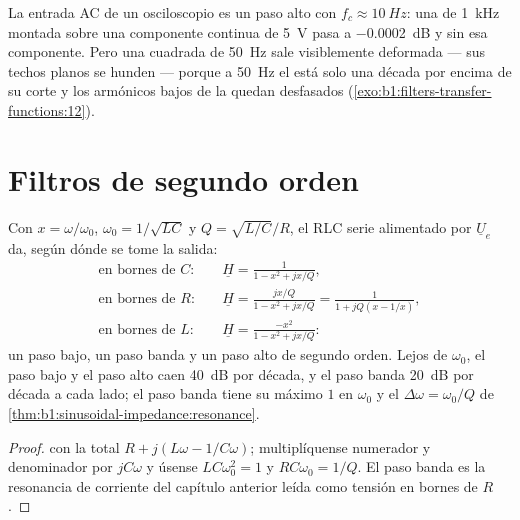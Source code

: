 \begin{example}\label{ex:b1:filters-transfer-functions:accoupling}
La entrada AC de un osciloscopio es un paso alto con
$f_c \approx \qty{10}{Hz}$: una  de \qty{1}{kHz} montada sobre una
componente continua de \qty{5}{V} pasa a \qty{-0.0002}{dB} y sin esa
componente. Pero una  cuadrada de \qty{50}{Hz} sale visiblemente
deformada --- sus techos planos se hunden --- porque a \qty{50}{Hz} el
 está solo una década por encima de su corte y los armónicos bajos
de la  quedan desfasados (\cref{exo:b1:filters-transfer-functions:12}).
\end{example}

\section{Filtros de segundo orden}

\begin{proposition}\label{prop:b1:filters-transfer-functions:rlc}
Con $x = \omega/\omega_0$, $\omega_0 = 1/\sqrt{LC}$ y $Q =
\sqrt{L/C}/R$, el RLC serie alimentado por $\underline U_e$ da, según
dónde se tome la salida:
\begin{align*}
\text{en bornes de } C:&\quad \underline H = \frac{1}{1 - x^2 + jx/Q}, \\
\text{en bornes de } R:&\quad \underline H = \frac{jx/Q}{1 - x^2 + jx/Q} = \frac{1}{1 + jQ(x - 1/x)}, \\
\text{en bornes de } L:&\quad \underline H = \frac{-x^2}{1 - x^2 + jx/Q}:
\end{align*}
un paso bajo, un paso banda y un paso alto de segundo orden. Lejos de
$\omega_0$, el paso bajo y el paso alto caen \qty{40}{dB} por década, y el
paso banda \qty{20}{dB} por década a cada lado; el paso banda tiene su
máximo $1$ en $\omega_0$ y el  $\Delta\omega =
\omega_0/Q$ de \cref{thm:b1:sinusoidal-impedance:resonance}.
\end{proposition}

\begin{proof}
 con la  total $R + j(L\omega - 1/C\omega)$;
multiplíquense numerador y denominador por $jC\omega$ y úsense
$LC\omega_0^2 = 1$ y $RC\omega_0 = 1/Q$. El paso banda es la resonancia de
corriente del capítulo anterior leída como tensión en bornes de $R$.
\end{proof}

